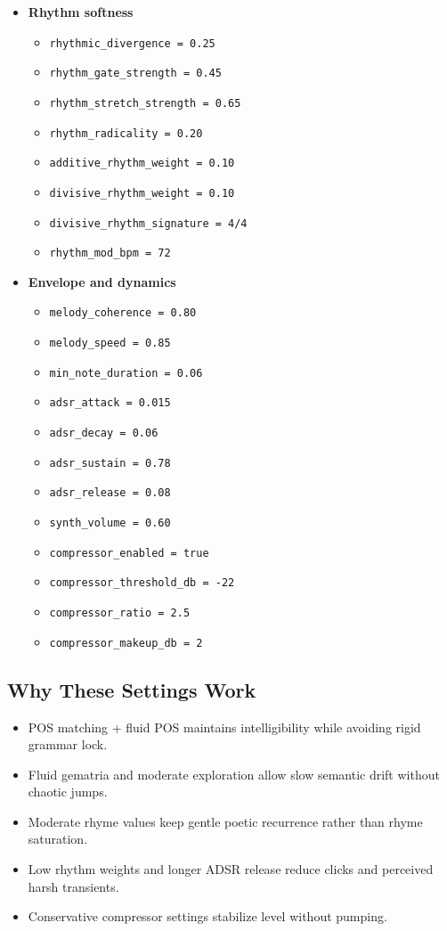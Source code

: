 \documentclass[11pt,a4paper]{article}
\begin{document}
\begin{itemize}
  \item \textbf{Rhythm softness}
  \begin{itemize}
    \item \texttt{rhythmic\_divergence = 0.25}
    \item \texttt{rhythm\_gate\_strength = 0.45}
    \item \texttt{rhythm\_stretch\_strength = 0.65}
    \item \texttt{rhythm\_radicality = 0.20}
    \item \texttt{additive\_rhythm\_weight = 0.10}
    \item \texttt{divisive\_rhythm\_weight = 0.10}
    \item \texttt{divisive\_rhythm\_signature = 4/4}
    \item \texttt{rhythm\_mod\_bpm = 72}
  \end{itemize}

  \item \textbf{Envelope and dynamics}
  \begin{itemize}
    \item \texttt{melody\_coherence = 0.80}
    \item \texttt{melody\_speed = 0.85}
    \item \texttt{min\_note\_duration = 0.06}
    \item \texttt{adsr\_attack = 0.015}
    \item \texttt{adsr\_decay = 0.06}
    \item \texttt{adsr\_sustain = 0.78}
    \item \texttt{adsr\_release = 0.08}
    \item \texttt{synth\_volume = 0.60}
    \item \texttt{compressor\_enabled = true}
    \item \texttt{compressor\_threshold\_db = -22}
    \item \texttt{compressor\_ratio = 2.5}
    \item \texttt{compressor\_makeup\_db = 2}
  \end{itemize}
\end{itemize}

\subsection*{Why These Settings Work}
\begin{itemize}
  \item POS matching + fluid POS maintains intelligibility while avoiding rigid grammar lock.
  \item Fluid gematria and moderate exploration allow slow semantic drift without chaotic jumps.
  \item Moderate rhyme values keep gentle poetic recurrence rather than rhyme saturation.
  \item Low rhythm weights and longer ADSR release reduce clicks and perceived harsh transients.
  \item Conservative compressor settings stabilize level without pumping.
\end{itemize}
\end{document}
